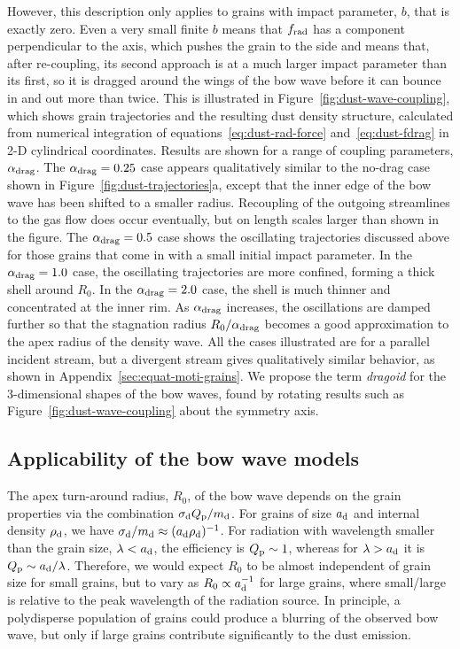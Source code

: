 However, this description only applies to grains with impact
parameter, \(b\), that is exactly zero.  Even a very small finite
\(b\) means that \(f_{\text{rad}}\) has a component perpendicular to the axis,
which pushes the grain to the side and means that, after re-coupling,
its second approach is at a much larger impact parameter than its
first, so it is dragged around the wings of the bow wave before it can
bounce in and out more than twice.  This is illustrated in
Figure~\ref{fig:dust-wave-coupling}, which shows grain trajectories
and the resulting dust density structure, calculated from numerical
integration of equations~\eqref{eq:dust-rad-force}
and~\eqref{eq:dust-fdrag} in 2-D cylindrical coordinates.  Results are
shown for a range of coupling parameters, \(\alpha_{\text{drag}}\).  The
\(\alpha_{\text{drag}} = 0.25\) case appears qualitatively similar to the no-drag
case shown in Figure~\ref{fig:dust-trajectories}a, except that the
inner edge of the bow wave has been shifted to a smaller radius.
Recoupling of the outgoing streamlines to the gas flow does occur
eventually, but on length scales larger than shown in the figure. The
\(\alpha_{\text{drag}} = 0.5\) case shows the oscillating trajectories discussed
above for those grains that come in with a small initial impact
parameter.  In the \(\alpha_{\text{drag}} = 1.0\) case, the oscillating trajectories
are more confined, forming a thick shell around \(R_0\).  In the
\(\alpha_{\text{drag}} = 2.0\) case, the shell is much thinner and concentrated at
the inner rim.  As \(\alpha_{\text{drag}}\) increases, the oscillations are damped
further so that the stagnation radius \(R_0 / \alpha_{\text{drag}}\) becomes a good
approximation to the apex radius of the density wave.  All the cases
illustrated are for a parallel incident stream, but a divergent stream
gives qualitatively similar behavior, as shown in
Appendix~\ref{sec:equat-moti-grains}.  We propose the term
\textit{dragoid} for the 3-dimensional shapes of the bow waves, found
by rotating results such as Figure~\ref{fig:dust-wave-coupling} about
the symmetry axis.


\subsection{Applicability of the bow wave models}
\label{sec:dust-applicability}

The apex turn-around radius, \(R_0\), of the bow wave depends on the
grain properties via the combination \(\sigma_{\text{d}} Q_{\text{p}} / m_{\text{d}}\).  For
grains of size \(a_{\text{d}}\) and internal density \(\rho_{\text{d}}\), we have
\(\sigma_{\text{d}} / m_{\text{d}} \approx (a_{\text{d}} \rho_{\text{d}})^{-1}\).  For radiation with
wavelength smaller than the grain size, \(\lambda < a_{\text{d}}\), the
efficiency is \(Q_{\text{p}} \sim 1\), whereas for \(\lambda > a_{\text{d}}\) it is
\(Q_{\text{p}} \sim a_{\text{d}}/\lambda\).  Therefore, we would expect \(R_0\) to be almost
independent of grain size for small grains, but to vary as
\(R_0 \propto a_{\text{d}}^{-1}\) for large grains, where small/large is relative
to the peak wavelength of the radiation source.  In principle, a
polydisperse population of grains could produce a blurring of the
observed bow wave, but only if large grains contribute significantly
to the dust emission.


